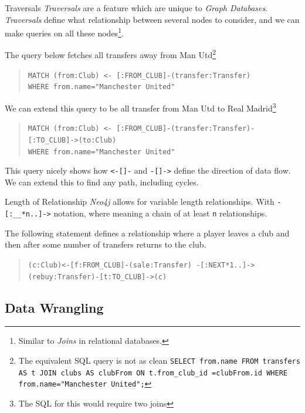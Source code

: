 \documentclass[11pt,a4paper]{article}
\begin{document}
  \begin{proposition}{Traversals}
    \textit{Traversals} are a feature which are unique to \textit{Graph Databases}. \textit{Traversals} define what relationship between several nodes to consider, and we can make queries on all these nodes\footnote{Similar to \textit{Joins} in relational databases.}.
    \par The query below fetches all transfers away from Man Utd\footnote{The equivalent SQL query is not as clean \texttt{SELECT from.name FROM transfers AS t JOIN clubs AS clubFrom ON t.from\_club\_id =clubFrom.id WHERE from.name="Manchester United";} }
    \begin{quote}
      \texttt{MATCH (from:Club) <- [:FROM\_CLUB]-(transfer:Transfer)}\\
      \texttt{WHERE from.name="Manchester United"}
    \end{quote}
    \par We can extend this query to be all transfer from Man Utd to Real Madrid\footnote{The SQL for this would require two joins}
    \begin{quote}
      \texttt{MATCH (from:Club) <- [:FROM\_CLUB]-(transfer:Transfer)-[:TO_CLUB]->(to:Club)}\\
      \texttt{WHERE from.name="Manchester United"}
    \end{quote}
    This query nicely shows how \texttt{<-[]-} and \texttt{-[]->} define the direction of data flow. We can extend this to find any path, including cycles.
  \end{proposition}

  \begin{proposition}{Length of Relationship}
    \textit{Neo4j} allows for variable length relationships. With \texttt{-[:\_\_*n..]->} notation, where meaning a chain of at least \texttt{n} relationships.
    \par The following statement defines a relationship where a player leaves a club and then after some number of transfers returns to the club.
    \begin{quote}
      \texttt{(c:Club)<-[f:FROM_CLUB]-(sale:Transfer) -[:NEXT*1..]->(rebuy:Transfer)-[t:TO_CLUB]->(c)}
    \end{quote}
  \end{proposition}

\subsection{Data Wrangling}
\end{document}

